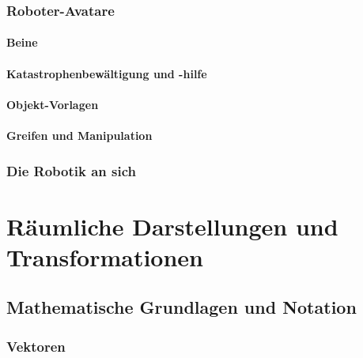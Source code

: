 \documentclass[a4paper, 11pt, accentcolor = tud3b]{tudreport}
\begin{document}
			\subsection{Roboter-Avatare} %

				\subsubsection{Beine} %

				\subsubsection{Katastrophenbewältigung und -hilfe} %

				\subsubsection{Objekt-Vorlagen} %

				\subsubsection{Greifen und Manipulation} %

			\subsection{Die Robotik an sich} %

	\chapter{Räumliche Darstellungen und Transformationen} %

		\section{Mathematische Grundlagen und Notation} %

			\subsection{Vektoren} %
\end{document}
